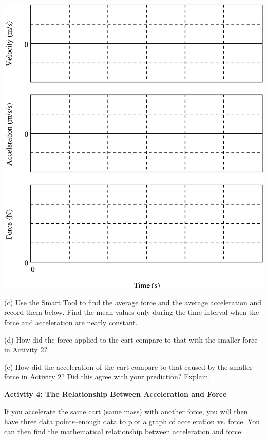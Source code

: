 \vspace{0.3cm}
{\par\centering \includegraphics{force1_fig5.eps} \par}
\vspace{0.3cm}

(c) Use the Smart Tool to find the average force and the average acceleration
and record them below. Find the mean values only during the time interval when
the force and acceleration are nearly constant.
\vspace{20mm}

(d) How did the force applied to the cart compare to that with the smaller force
in Activity 2?
\vspace{20mm}

(e) How did the acceleration of the cart compare to that caused by the smaller
force in Activity 2? Did this agree with your prediction? Explain.
\vspace{20mm}

\textbf{Activity 4: The Relationship Between Acceleration and Force }

If you accelerate the same cart (same mass) with another force, you will then
have three data points--enough data to plot a graph of acceleration vs. force.
You can then find the mathematical relationship between acceleration and force. 

